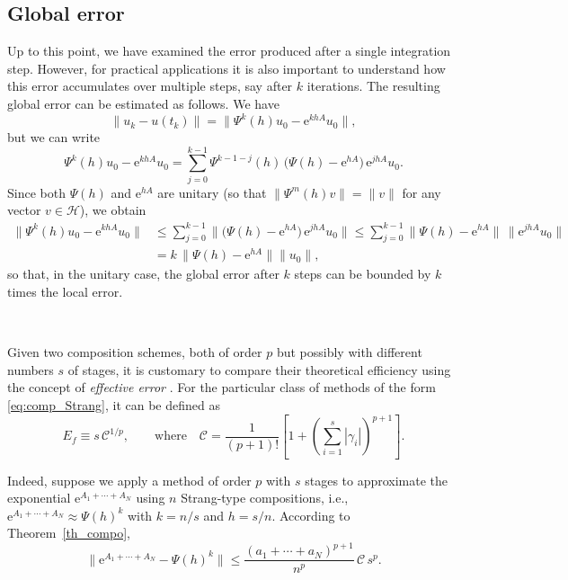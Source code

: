 \documentclass[11pt]{article}
\newcommand{\e}{\ensuremath{\mathrm{e}}}
\begin{document}
\subsection{Global error}
Up to this point, we have examined the error produced after a single integration step. However, for practical applications it is also important 
to understand how this error accumulates over multiple steps, say after $k$ iterations.
The resulting global error can be estimated as follows. We have
\[
  \|u_k - u(t_k)\| = \| \Psi^k(h) u_0 - \e^{k h A} u_0\|,
\]
but we can write
\[
\Psi^k(h) u_0 - \e^{k h A} u_0 = \sum_{j=0}^{k-1} \Psi^{k-1-j}(h) \, \big(\Psi(h) - \e^{h A} \big) \, \e^{j h A} u_0.
\]
Since both $\Psi(h)$ and $\e^{h A}$ are unitary (so that $\|\Psi^m(h) v\| = \|v\|$ for any vector $v \in \mathcal{H}$), we obtain
\[
\begin{aligned}
\| \Psi^k(h) u_0- \e^{k h A} u_0\| & \leq \sum_{j=0}^{k-1} \|\big(\Psi(h) - \e^{h A}\big) \, \e^{j h A} u_0\| 
\leq \sum_{j=0}^{k-1} \|\Psi(h) - \e^{h A}\| \, \|\e^{j h A} u_0\| \\
& = k \, \| \Psi(h) - \e^{h A} \| \|u_0\|,
\end{aligned}
\]
so that, in the unitary case, the global error after $k$ steps can be bounded by $k$ times the local error.

\

Given two composition schemes, both of order $p$ but possibly with different numbers $s$ of stages, it is customary to compare their theoretical efficiency using the concept of {\em effective error} \cite{mclachlan95otn,blanes99siw,mclachlan02foh}. For the particular class of methods of the form \eqref{eq:comp_Strang}, it can be defined as
\begin{equation} \label{valueC}
   E_f  \equiv s \, \mathcal{C}^{1/p}, \qquad \text{where} \quad \mathcal{C} = \frac{1}{(p+1)!} \left[ 1 +  \left( \sum_{i=1}^s |\gamma_i| \right)^{p+1} \right].
\end{equation}

Indeed, suppose we apply a method of order $p$ with $s$ stages to approximate the exponential $\e^{A_1+\cdots+A_N}$ using $n$ Strang-type compositions, i.e., $\e^{A_1+\cdots+A_N} \approx \Psi(h)^k$ with $k = n/s$ and $h = s/n$. According to Theorem~\ref{th_compo},
\begin{equation}
\label{eq:global_error_estimate}
\|\e^{A_1+\cdots+A_N} - \Psi(h)^k\| \leq \frac{(a_1 + \cdots + a_N)^{p+1}}{n^p}\, \mathcal{C}\, s^p.
\end{equation}
\end{document}
